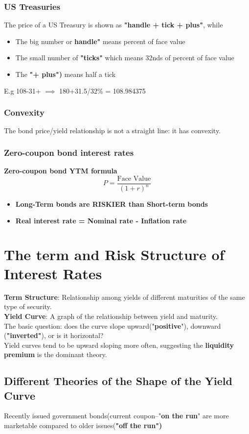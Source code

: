 \documentclass{article}
\theoremstyle{definition}
\theoremstyle{thrm}
\theoremstyle{lma}
\theoremstyle{ppst}
\theoremstyle{crlr}
\begin{document}
\subsubsection{US Treasuries}
The price of a US Treasury is shown as \textbf{"handle + tick + plus"}, while
\begin{itemize}
	\item The big number or \textbf{handle"} means percent of face value
	\item The small number of \textbf{"ticks"} which means 32nds of percent of face value
	\item The \textbf{"+ plus")} means half a tick
\end{itemize}
E.g 108-31+ $\implies $ 180+31.5/32\% = 108.984375
\subsubsection{Convexity}
The bond price/yield relationship is not a straight line: it has convexity.
\subsubsection{Zero-coupon bond interest rates}
\textbf{Zero-coupon bond YTM formula}
\begin{equation*}
	P = \frac{\text{Face Value}}{(1+r)^n}
\end{equation*}
\begin{itemize}
	\item \textbf{Long-Term bonds are RISKIER than Short-term bonds}
	\item \textbf{Real interest rate = Nominal rate - Inflation rate}
\end{itemize}


\section{The term and Risk Structure of Interest Rates}
\textbf{Term Structure}: Relationship among yields of different maturities of the same type of security.\\
\textbf{Yield Curve}: A graph of the relationship between yield and maturity.\\
The basic question: does the curve slope upward("\textbf{positive}"), downward (\textbf{"inverted"}), or is it horizontal?\\
Yield curves tend to be upward sloping more often, suggesting the \textbf{liquidity premium} is the dominant theory.
\subsection{Different Theories of the Shape of the Yield Curve}
Recently issued government bonds(current coupon--"\textbf{on the run}" are more marketable compared to older issues(\textbf{"off the run")}
\end{document}
